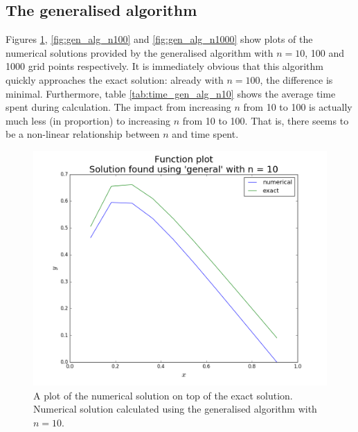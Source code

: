 \documentclass[reprint,english]{revtex4-1}
\begin{document}
\subsection{The generalised algorithm}
Figures \ref{fig:gen_alg_n10}, \ref{fig:gen_alg_n100} and \ref{fig:gen_alg_n1000} show plots of the numerical solutions provided by the generalised algorithm with \(n=10\), 100 and 1000 grid points respectively. It is immediately obvious that this algorithm quickly approaches the exact solution: already with \(n=100\), the difference is minimal. Furthermore, table \ref{tab:time_gen_alg_n10} shows the average time spent during calculation. The impact from increasing \(n\) from 10 to 100 is actually much less (in proportion) to increasing \(n\) from 10 to 100. That is, there seems to be a non-linear relationship between \(n\) and time spent.
\begin{figure}[h]
\includegraphics[scale=0.28]{figures/general_10_funcplot.png}
\caption{A plot of the numerical solution on top of the exact solution. Numerical solution calculated using the generalised algorithm with \(n=10\).}\label{fig:gen_alg_n10}
\end{figure}
\end{document}

